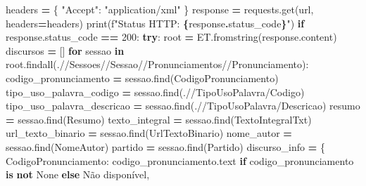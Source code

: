 \documentclass[
]{article}
\newenvironment{Shaded}{\begin{snugshade}}{\end{snugshade}}
\newcommand{\BuiltInTok}[1]{#1}
\newcommand{\ControlFlowTok}[1]{\textcolor[rgb]{0.13,0.29,0.53}{\textbf{#1}}}
\newcommand{\DecValTok}[1]{\textcolor[rgb]{0.00,0.00,0.81}{#1}}
\newcommand{\KeywordTok}[1]{\textcolor[rgb]{0.13,0.29,0.53}{\textbf{#1}}}
\newcommand{\NormalTok}[1]{#1}
\newcommand{\OperatorTok}[1]{\textcolor[rgb]{0.81,0.36,0.00}{\textbf{#1}}}
\newcommand{\SpecialCharTok}[1]{\textcolor[rgb]{0.81,0.36,0.00}{\textbf{#1}}}
\newcommand{\SpecialStringTok}[1]{\textcolor[rgb]{0.31,0.60,0.02}{#1}}
\newcommand{\StringTok}[1]{\textcolor[rgb]{0.31,0.60,0.02}{#1}}
\newcommand{\VariableTok}[1]{\textcolor[rgb]{0.00,0.00,0.00}{#1}}
\begin{document}
\begin{Shaded}
\begin{Highlighting}[]
\NormalTok{    headers }\OperatorTok{=}\NormalTok{ \{}
        \StringTok{"Accept"}\NormalTok{: }\StringTok{"application/xml"}
\NormalTok{    \}}
\NormalTok{    response }\OperatorTok{=}\NormalTok{ requests.get(url, headers}\OperatorTok{=}\NormalTok{headers)}
    \BuiltInTok{print}\NormalTok{(}\SpecialStringTok{f"Status HTTP: }\SpecialCharTok{\{}\NormalTok{response}\SpecialCharTok{.}\NormalTok{status\_code}\SpecialCharTok{\}}\SpecialStringTok{"}\NormalTok{)}
    \ControlFlowTok{if}\NormalTok{ response.status\_code }\OperatorTok{==} \DecValTok{200}\NormalTok{:}
        \ControlFlowTok{try}\NormalTok{:}
\NormalTok{            root }\OperatorTok{=}\NormalTok{ ET.fromstring(response.content)}
\NormalTok{            discursos }\OperatorTok{=}\NormalTok{ []}
            \ControlFlowTok{for}\NormalTok{ sessao }\KeywordTok{in}\NormalTok{ root.findall(}\StringTok{\textquotesingle{}.//Sessoes//Sessao//Pronunciamentos//Pronunciamento\textquotesingle{}}\NormalTok{):              }
\NormalTok{                codigo\_pronunciamento }\OperatorTok{=}\NormalTok{ sessao.find(}\StringTok{\textquotesingle{}CodigoPronunciamento\textquotesingle{}}\NormalTok{)}
\NormalTok{                tipo\_uso\_palavra\_codigo }\OperatorTok{=}\NormalTok{ sessao.find(}\StringTok{\textquotesingle{}.//TipoUsoPalavra/Codigo\textquotesingle{}}\NormalTok{)}
\NormalTok{                tipo\_uso\_palavra\_descricao }\OperatorTok{=}\NormalTok{ sessao.find(}\StringTok{\textquotesingle{}.//TipoUsoPalavra/Descricao\textquotesingle{}}\NormalTok{)}
\NormalTok{                resumo }\OperatorTok{=}\NormalTok{ sessao.find(}\StringTok{\textquotesingle{}Resumo\textquotesingle{}}\NormalTok{)}
\NormalTok{                texto\_integral }\OperatorTok{=}\NormalTok{ sessao.find(}\StringTok{\textquotesingle{}TextoIntegralTxt\textquotesingle{}}\NormalTok{)}
\NormalTok{                url\_texto\_binario }\OperatorTok{=}\NormalTok{ sessao.find(}\StringTok{\textquotesingle{}UrlTextoBinario\textquotesingle{}}\NormalTok{)       }
\NormalTok{                nome\_autor }\OperatorTok{=}\NormalTok{ sessao.find(}\StringTok{\textquotesingle{}NomeAutor\textquotesingle{}}\NormalTok{)}
\NormalTok{                partido }\OperatorTok{=}\NormalTok{ sessao.find(}\StringTok{\textquotesingle{}Partido\textquotesingle{}}\NormalTok{)}
\NormalTok{                discurso\_info }\OperatorTok{=}\NormalTok{ \{}
                    \StringTok{\textquotesingle{}CodigoPronunciamento\textquotesingle{}}\NormalTok{: codigo\_pronunciamento.text }\ControlFlowTok{if}\NormalTok{ codigo\_pronunciamento }\KeywordTok{is} \KeywordTok{not} \VariableTok{None} \ControlFlowTok{else} \StringTok{\textquotesingle{}Não disponível\textquotesingle{}}\NormalTok{,}

\end{Highlighting}
\end{Shaded}
\end{document}
